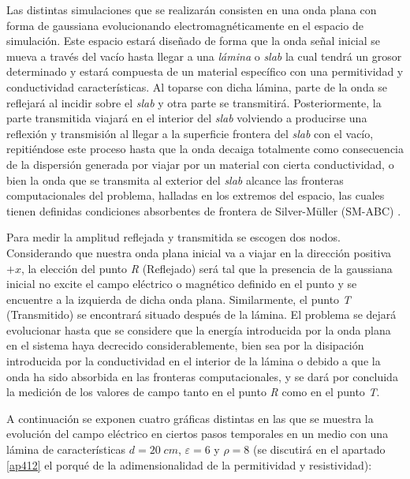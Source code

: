 \documentclass[11pt,a4paper,twoside,pdf]{article}
\numberwithin{equation}{section}
\begin{document}
Las distintas simulaciones que se realizarán consisten en una onda plana con forma de gaussiana evolucionando electromagnéticamente en el espacio de simulación. Este espacio estará diseñado de forma que la onda señal inicial se mueva a través del vacío hasta llegar a una \textit{lámina} o \textit{slab} la cual tendrá un grosor determinado y estará compuesta de un material específico con una permitividad y conductividad características.  Al toparse con dicha lámina, parte de la onda se reflejará al incidir sobre el \textit{slab} y otra parte se transmitirá. Posteriormente, la parte transmitida viajará en el interior del \textit{slab} volviendo a producirse una reflexión y transmisión al llegar a la superficie frontera del \textit{slab} con el vacío, repitiéndose este proceso hasta que la onda decaiga totalmente como consecuencia de la dispersión generada por viajar por un material con cierta conductividad, o bien la onda que se transmita al exterior del \textit{slab} alcance las fronteras computacionales del problema, halladas en los extremos del espacio, las cuales tienen definidas condiciones absorbentes de frontera de Silver-Müller (SM-ABC) \cite{SMA}. 

Para medir la amplitud reflejada y transmitida se escogen dos nodos. Considerando que nuestra onda plana inicial va a viajar en la dirección positiva $+x$, la elección del punto \textit{R} (Reflejado) será tal que la presencia de la gaussiana inicial no excite el campo eléctrico o magnético definido en el punto y se encuentre a la izquierda de dicha onda plana. Similarmente, el punto \textit{T} (Transmitido) se encontrará situado después de la lámina. El problema se dejará evolucionar hasta que se considere que la energía introducida por la onda plana en el sistema haya decrecido considerablemente, bien sea por la disipación introducida por la conductividad en el interior de la lámina o debido a que la onda ha sido absorbida en las fronteras computacionales, y se dará por concluida la medición de los valores de campo tanto en el punto \textit{R} como en el punto \textit{T}.

A continuación se exponen cuatro gráficas distintas en las que se muestra la evolución del campo eléctrico en ciertos pasos temporales en un medio con una lámina de características $d=20\;cm$, $\varepsilon=6$ y $\rho=8$ (se discutirá en el apartado \ref{ap412} el porqué de la adimensionalidad de la permitividad y resistividad):
\end{document}
